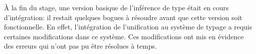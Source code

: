         \`A la fin du stage, une version basique de l'inférence de type était en cours d'intégration: il restait quelques bogues à résoudre avant que
        cette version soit fonctionnelle. En effet, l'intégration de l'unification au système de typage a requis certaines modifications dans
        ce système. Ces modifications ont mis en évidence des erreurs qui n'ont pas pu être résolues à temps.
